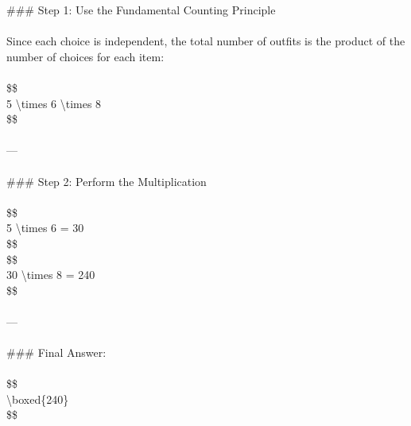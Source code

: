 \begin{minipage}[t]{0.31\linewidth}
\#\#\# Step 1: Use the Fundamental Counting Principle\\
\mbox{}\\
Since each choice is independent, the total number of outfits is the product of the number of choices for each item:\\
\mbox{}\\
\$\$\\
5 \textbackslash{}times 6 \textbackslash{}times 8\\
\$\$\\
\mbox{}\\
---\\
\mbox{}\\
\#\#\# Step 2: Perform the Multiplication\\
\mbox{}\\
\$\$\\
5 \textbackslash{}times 6 = 30\\
\$\$\\
\$\$\\
30 \textbackslash{}times 8 = 240\\
\$\$\\
\mbox{}\\
---\\
\mbox{}\\
\#\#\# Final Answer:\\
\mbox{}\\
\$\$\\
\textbackslash{}boxed\{240\}\\
\$\$
\end{minipage}
